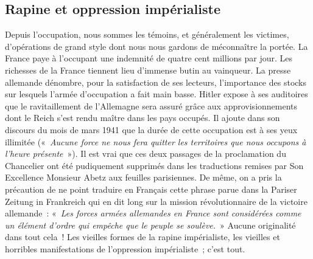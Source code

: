 \documentclass[french,twoside]{book} %
\begin{document}
\subsection[Rapine et oppression impérialiste]{Rapine et oppression impérialiste}
\noindent Depuis l’occupation, nous sommes les témoins, et généralement les victimes, d’opérations de grand style dont nous nous gardons de méconnaître la portée. La France paye à l’occupant une indemnité de quatre cent millions par jour. Les richesses de la France tiennent lieu d’immense butin au vainqueur. La presse allemande dénombre, pour la satisfaction de ses lecteurs, l’importance des stocks sur lesquels l’armée d’occupation a fait main basse. Hitler expose à ses auditoires que le ravitaillement de l’Allemagne sera assuré grâce aux approvisionnements dont le Reich s’est rendu maître dans les pays occupés. Il ajoute dans son discours du mois de mars 1941 que la durée de cette occupation est à ses yeux illimitée (« \emph{Aucune force ne nous fera quitter les territoires que nous occupons à l’heure présente} »). Il est vrai que ces deux passages de la proclamation du Chancelier ont été pudiquement supprimés dans les traductions remises par Son Excellence Monsieur Abetz aux feuilles parisiennes. De même, on a pris la précaution de ne point traduire en Français cette phrase parue dans la Pariser Zeitung in Frankreich qui en dit long sur la mission révolutionnaire de la victoire allemande : « \emph{Les forces armées allemandes en France sont considérées comme un élément d’ordre qui empêche que le peuple se soulève.} » Aucune originalité dans tout cela ! Les vieilles formes de la rapine impérialiste, les vieilles et horribles manifestations de l’oppression impérialiste ; c’est tout.
\end{document}

